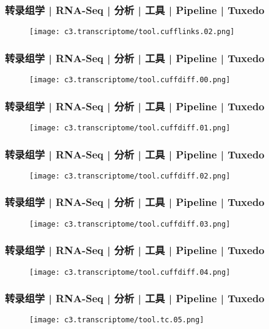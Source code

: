 \begin{frame}
  \frametitle{转录组学 | RNA-Seq | 分析 | 工具 | Pipeline | Tuxedo}
  \begin{figure}
    \centering
    \texttt{[image: c3.transcriptome/tool.cufflinks.02.png]}
  \end{figure}
\end{frame}

\begin{frame}
  \frametitle{转录组学 | RNA-Seq | 分析 | 工具 | Pipeline | Tuxedo}
  \begin{figure}
    \centering
    \texttt{[image: c3.transcriptome/tool.cuffdiff.00.png]}
  \end{figure}
\end{frame}

\begin{frame}
  \frametitle{转录组学 | RNA-Seq | 分析 | 工具 | Pipeline | Tuxedo}
  \begin{figure}
    \centering
    \texttt{[image: c3.transcriptome/tool.cuffdiff.01.png]}
  \end{figure}
\end{frame}

\begin{frame}
  \frametitle{转录组学 | RNA-Seq | 分析 | 工具 | Pipeline | Tuxedo}
  \begin{figure}
    \centering
    \texttt{[image: c3.transcriptome/tool.cuffdiff.02.png]}
  \end{figure}
\end{frame}

\begin{frame}
  \frametitle{转录组学 | RNA-Seq | 分析 | 工具 | Pipeline | Tuxedo}
  \begin{figure}
    \centering
    \texttt{[image: c3.transcriptome/tool.cuffdiff.03.png]}
  \end{figure}
\end{frame}

\begin{frame}
  \frametitle{转录组学 | RNA-Seq | 分析 | 工具 | Pipeline | Tuxedo}
  \begin{figure}
    \centering
    \texttt{[image: c3.transcriptome/tool.cuffdiff.04.png]}
  \end{figure}
\end{frame}

\begin{frame}
  \frametitle{转录组学 | RNA-Seq | 分析 | 工具 | Pipeline | Tuxedo}
  \begin{figure}
    \centering
    \texttt{[image: c3.transcriptome/tool.tc.05.png]}
  \end{figure}
\end{frame}

